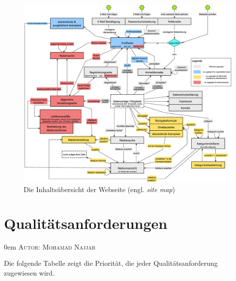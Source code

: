 \documentclass{article}
\makeatletter
\newcommand{\sectionauthor}[1]{
	{\parindent 0em \large \scshape Autor: #1 \par \nobreak \vspace*{2em}}
	\@afterheading
}
\makeatother
\begin{document}
\newpage
{}

\begin{figure}[h]
    \centering
    \includegraphics[angle = 270, width = 60em]{site_map}
    \caption{Die Inhaltsübersicht der Webseite (engl. \textit{site map})}
    \label{site_map}
\end{figure}

\restoregeometry
\newpage

\section{Qualitätsanforderungen} %
\sectionauthor{Mohamad Najjar}

	Die folgende Tabelle zeigt die Priorität, die jeder Qualitätsanforderung zugewiesen wird.
\end{document}
